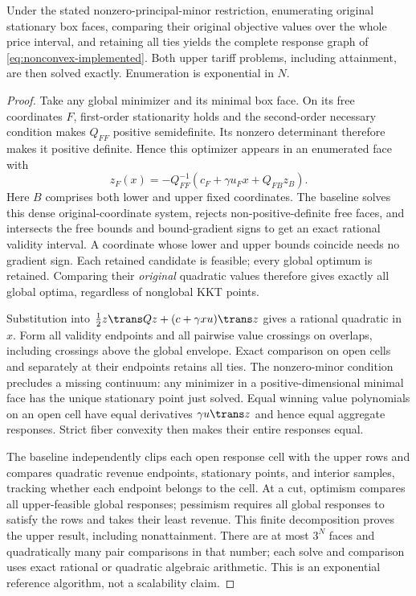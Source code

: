 \begin{proposition}
\label{prop:original-face-baseline}
Under the stated nonzero-principal-minor restriction, enumerating original
stationary box faces, comparing their original objective values over the
whole price interval, and retaining all ties yields the complete response
graph of \eqref{eq:nonconvex-implemented}. Both upper tariff problems, including
attainment, are then solved exactly. Enumeration is exponential in $N$.
\end{proposition}
\begin{proof}
Take any global minimizer and its minimal box face. On its free coordinates
$F$, first-order stationarity holds and the second-order necessary condition
makes $Q_{FF}$ positive semidefinite. Its nonzero determinant therefore makes
it positive definite. Hence this optimizer appears in an enumerated face with
\[
 z_F(x)=-Q_{FF}^{-1}(c_F+\gamma u_Fx+Q_{FB}z_B).
\]
Here $B$ comprises both lower and upper fixed coordinates. The baseline
solves this dense original-coordinate system, rejects non-positive-definite
free faces, and intersects the free bounds and bound-gradient signs to get an
exact rational validity interval. A coordinate whose lower and upper bounds
coincide needs no gradient sign. Each retained candidate is feasible; every
global optimum is retained. Comparing their \emph{original} quadratic values
therefore gives exactly all global optima, regardless of nonglobal KKT points.

Substitution into $\tfrac12z\trans Qz+(c+\gamma xu)\trans z$ gives a rational
quadratic in $x$. Form all validity endpoints and all pairwise value crossings
on overlaps, including crossings above the global envelope. Exact comparison
on open cells and separately at their endpoints retains all ties. The
nonzero-minor condition precludes a missing continuum: any minimizer in a
positive-dimensional minimal face has the unique stationary point just solved.
Equal winning value polynomials on an open cell have equal derivatives
$\gamma u\trans z$ and hence equal aggregate responses. Strict fiber convexity
then makes their entire responses equal.

The baseline independently clips each open response cell with the upper rows
and compares quadratic revenue endpoints, stationary points, and interior
samples, tracking whether each endpoint belongs to the cell. At a cut,
optimism compares all upper-feasible global responses; pessimism requires
all global responses to satisfy the rows and takes their least revenue.
This finite decomposition proves the upper result, including nonattainment.
There are at most $3^N$ faces and quadratically many pair comparisons in that
number; each solve and comparison uses exact rational or quadratic algebraic
arithmetic. This is an exponential reference algorithm, not a scalability claim.
\end{proof}

